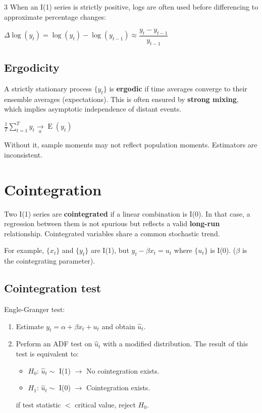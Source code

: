 \documentclass[10pt, a4paper, landscape]{article}
\DeclareMathOperator{\E}{E}
\begin{document}
\begin{multicols}{3}
\vspace*{0.1cm}
When an I(1) series is strictly positive, logs are often used before differencing to approximate percentage changes:

\begin{center}
	\( \Delta \log(y_{t}) = \log(y_{t}) - \log(y_{t - 1}) \approx \dfrac{y_t - y_{t - 1}} {y_{t - 1}} \)
\end{center}

\columnbreak

\subsection*{Ergodicity}

A strictly stationary process \( \{ y_{t} \} \) is \textbf{ergodic} if time averages converge to their ensemble averages (expectations). This is often ensured by \textbf{strong mixing}, which implies asymptotic independence of distant events.

\begin{center}
	\( \frac{1}{T} \sum_{t = 1}^{T} y_{t} \underset{a}{\rightarrow} \E(y_{t}) \)
\end{center}

Without it, sample moments may not reflect population moments. Estimators are inconsistent.

\section*{Cointegration}

Two I(1) series are \textbf{cointegrated} if a linear combination is I(0). In that case, a regression between them is not spurious but reflects a valid \textbf{long-run} relationship. Cointegrated variables share a common stochastic trend.

For example, \( \{ x_{t} \} \) and \( \{ y_{t} \} \) are I(1), but \( y_{t} - \beta x_{t} = u_{t} \) where \( \{ u_{t} \} \) is I(0). (\( \beta \) is the cointegrating parameter).

\subsection*{Cointegration test}

Engle-Granger test:

\begin{enumerate}[leftmargin=*]
	\item Estimate \( y_{t} = \alpha + \beta x_{t} + u_{t} \) and obtain \( \hat{u}_{t} \).
	\item Perform an ADF test on \( \hat{u}_{t} \) with a modified distribution.
	The result of this test is equivalent to:
	\begin{itemize}[leftmargin=*]
		\item \( H_{0} \):  \( \hat{u}_{t} \sim \) I(1) \( \rightarrow \) No cointegration exists.
		\item \( H_{1} \): \( \hat{u}_{t} \sim \) I(0) \( \rightarrow \) Cointegration exists.
	\end{itemize}
	if test statistic \( < \) critical value, reject \( H_{0} \).
\end{enumerate}


\end{multicols}
\end{document}
